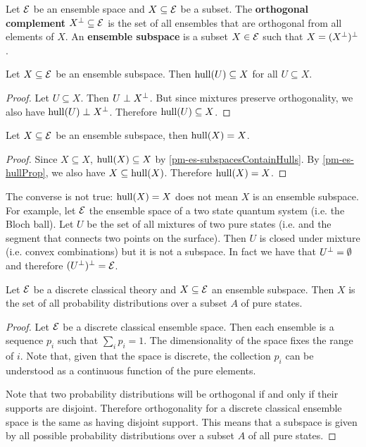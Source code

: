 \begin{defn}
	Let $\mathcal{E}$ be an ensemble space and $X \subseteq \mathcal{E}$ be a subset. The \textbf{orthogonal complement} $X^\perp \subseteq \mathcal{E}$ is the set of all ensembles that are orthogonal from all elements of $X$. An \textbf{ensemble subspace} is a subset $X \in \mathcal{E}$ such that $X = (X^\perp)^\perp$.
\end{defn}

\begin{prop}\label{pm-es-subspacesContainHulls}
	Let $X \subseteq \mathcal{E}$ be an ensemble subspace. Then $\mathrm{hull}(U) \subseteq X$ for all $U \subseteq X$.
\end{prop}

\begin{proof}
	Let $U \subseteq X$. Then $U \perp X^{\perp}$. But since mixtures preserve orthogonality, we also have $\mathrm{hull}(U) \perp X^{\perp}$. Therefore $\mathrm{hull}(U) \subseteq X$.
\end{proof}

\begin{coro}
	Let $X \subseteq \mathcal{E}$ be an ensemble subspace, then $\mathrm{hull}(X) = X$.
\end{coro}

\begin{proof}
	Since $X \subseteq X$, $\mathrm{hull}(X) \subseteq X$ by \ref{pm-es-subspacesContainHulls}. By \ref{pm-es-hullProp}, we also have $X \subseteq \mathrm{hull}(X)$. Therefore $\mathrm{hull}(X) = X$.
\end{proof}

\begin{remark}
	The converse is not true: $\mathrm{hull}(X) = X$ does not mean $X$ is an ensemble subspace. For example, let $\mathcal{E}$ the ensemble space of a two state quantum system (i.e. the Bloch ball). Let $U$ be the set of all mixtures of two pure states (i.e. and the segment that connects two points on the surface). Then $U$ is closed under mixture (i.e. convex combinations) but it is not a subspace. In fact we have that $U^{\perp}=\emptyset$ and therefore $(U^\perp)^\perp = \mathcal{E}$.
\end{remark}

\begin{prop}
	Let $\mathcal{E}$ be a discrete classical theory and $X \subseteq \mathcal{E}$ an ensemble subspace. Then $X$ is the set of all probability distributions over a subset $A$ of pure states.
\end{prop}

\begin{proof}
	Let $\mathcal{E}$ be a discrete classical ensemble space. Then each ensemble is a sequence $p_i$ such that $\sum_i p_i = 1$. The dimensionality of the space fixes the range of $i$. Note that, given that the space is discrete, the collection $p_i$ can be understood as a continuous function of the pure elements.
	
	Note that two probability distributions will be orthogonal if and only if their supports are disjoint. Therefore orthogonality for a discrete classical ensemble space is the same as having disjoint support. This means that a subspace is given by all possible probability distributions over a subset $A$ of all pure states.
\end{proof}

